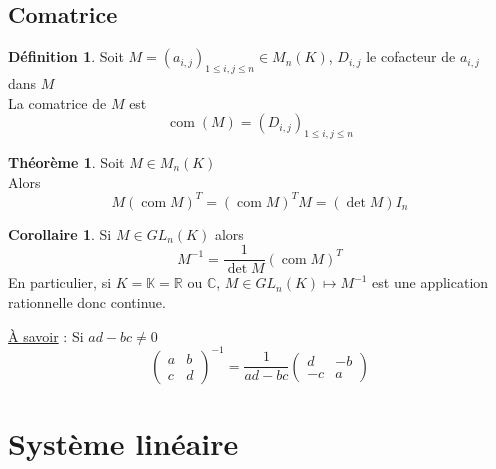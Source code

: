 \documentclass[10pt,a4paper]{article}
\theoremstyle{definition}
\newtheorem{theorem}[proposition]{Théorème}
\newtheorem{corollaire}[proposition]{Corollaire}
\newtheorem{definition}[proposition]{Définition}
\DeclareMathOperator{\com}{com}
\begin{document}
\subsection{Comatrice}
\begin{definition}
Soit $M = (a_{i, j})_{1 \leq i, j \leq n} \in M_n(K)$, $D_{i, j}$ le cofacteur de $a_{i, j}$ dans $M$ \\
La comatrice de $M$ est
\[ \com(M) = (D_{i, j})_{1 \leq i, j \leq n} \]
\end{definition}
\begin{theorem}
Soit $M \in M_n(K)$ \\
Alors
\[ M(\com M)^T = (\com M)^T M = (\det M) I_n \]
\end{theorem}
\begin{corollaire}
Si $M \in GL_n(K)$ alors
\[ M^{-1} = \frac{1}{\det M}(\com M)^T \]
En particulier, si $K = \mathbb{K} = \mathbb{R} \text{ ou } \mathbb{C}$, $M \in GL_n(K) \mapsto M^{-1}$ est une application rationnelle donc continue.
\end{corollaire}
\noindent \uline{À savoir} : Si $ad - bc \neq 0$
\[ \begin{pmatrix}
a & b \\
c & d
\end{pmatrix}^{-1} = \frac{1}{ad - bc} \begin{pmatrix}
d & -b \\
-c & a
\end{pmatrix} \]

\pagebreak

\section{Système linéaire}
\end{document}
